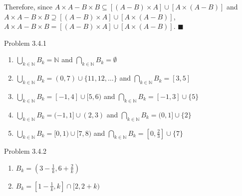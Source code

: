 \documentclass{article}
\theoremstyle{definition}
\newcommand{\N}{\mathbb{N}}
\begin{document}
	Therefore, since $A\times A-B\times B\subseteq[(A-B)\times A]\cup
	[A\times (A-B)]$ and $A\times A-B\times B\supseteq[(A-B)\times
	A]\cup [A\times (A-B)]$, $A\times A-B\times B=[(A-B)\times A]\cup
	[A\times (A-B)]$. $\blacksquare$

	\vspace{1cm}



	\noindent Problem 3.4.1  \vspace{0.3cm}


	\begin{enumerate}
		\item[2] $\bigcup_{k\in\N} B_k=\N$ and $\bigcap_{k\in\N}
		B_k=\emptyset$
		\item[3] $\bigcup_{k\in\N} B_k=(0,7)\cup\{11, 12, \ldots\}$ and $\bigcap_{k\in\N}
		B_k=[3,5]$
		\item[4] $\bigcup_{k\in\N} B_k=[-1,4]\cup[5,6)$ and $\bigcap_{k\in\N}
		B_k=[-1,3]\cup\{5\}$
		\item[5] $\bigcup_{k\in\N} B_k=(-1,1]\cup(2,3)$ and $\bigcap_{k\in\N}
		B_k=(0,1]\cup\{2\}$
		\item[6] $\bigcup_{k\in\N} B_k=[0,1)\cup[7,8)$ and $\bigcap_{k\in\N}
		B_k=[0,\frac{2}{3}]\cup\{7\}$

	\end{enumerate}

	\vspace{1cm}



	\noindent Problem 3.4.2  \vspace{0.3cm}


	\begin{enumerate}
		\item[4] $B_k=(3-\frac{1}{k},6+\frac{2}{k})$
		\item[5] $B_k=[1-\frac{1}{k},k]\cap[2,2+k)$
	\end{enumerate}

	\vspace{1cm}

\end{document}

